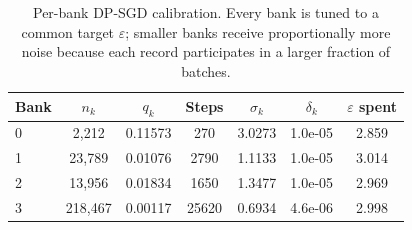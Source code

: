 \begin{table}[htbp]
\centering
\caption{Per-bank DP-SGD calibration. Every bank is tuned to a common target $\varepsilon$; smaller banks receive proportionally more noise because each record participates in a larger fraction of batches.}
\label{tab:privacy}
\begin{tabular}{lcccccc}
\toprule
Bank & $n_k$ & $q_k$ & Steps & $\sigma_k$ & $\delta_k$ & $\varepsilon$ spent \\
\midrule
0 & 2,212 & 0.11573 & 270 & 3.0273 & 1.0e-05 & 2.859 \\
1 & 23,789 & 0.01076 & 2790 & 1.1133 & 1.0e-05 & 3.014 \\
2 & 13,956 & 0.01834 & 1650 & 1.3477 & 1.0e-05 & 2.969 \\
3 & 218,467 & 0.00117 & 25620 & 0.6934 & 4.6e-06 & 2.998 \\
\bottomrule
\end{tabular}
\end{table}